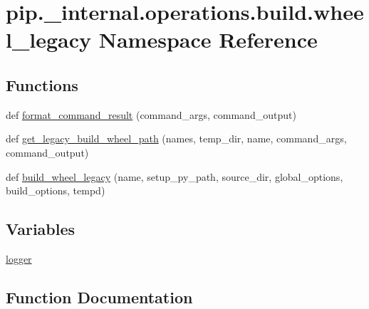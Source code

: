 \hypertarget{namespacepip_1_1__internal_1_1operations_1_1build_1_1wheel__legacy}{}\section{pip.\+\_\+internal.\+operations.\+build.\+wheel\+\_\+legacy Namespace Reference}
\label{namespacepip_1_1__internal_1_1operations_1_1build_1_1wheel__legacy}
\subsection*{Functions}
\begin{DoxyCompactItemize}
\item 
def \hyperlink{namespacepip_1_1__internal_1_1operations_1_1build_1_1wheel__legacy_a0d79cb58123323e40ce8f685ec0d5cb7}{format\+\_\+command\+\_\+result} (command\+\_\+args, command\+\_\+output)
\item 
def \hyperlink{namespacepip_1_1__internal_1_1operations_1_1build_1_1wheel__legacy_abfabf1b143c39c171d9c1c9c1c70d40a}{get\+\_\+legacy\+\_\+build\+\_\+wheel\+\_\+path} (names, temp\+\_\+dir, name, command\+\_\+args, command\+\_\+output)
\item 
def \hyperlink{namespacepip_1_1__internal_1_1operations_1_1build_1_1wheel__legacy_acc8d8ae15c52e63da5315afa62ee379c}{build\+\_\+wheel\+\_\+legacy} (name, setup\+\_\+py\+\_\+path, source\+\_\+dir, global\+\_\+options, build\+\_\+options, tempd)
\end{DoxyCompactItemize}
\subsection*{Variables}
\begin{DoxyCompactItemize}
\item 
\hyperlink{namespacepip_1_1__internal_1_1operations_1_1build_1_1wheel__legacy_ae05d7427eced79e295c9665a4f968e0c}{logger}
\end{DoxyCompactItemize}


\subsection{Function Documentation}
\mbox{\label{namespacepip_1_1__internal_1_1operations_1_1build_1_1wheel__legacy_acc8d8ae15c52e63da5315afa62ee379c}} 
